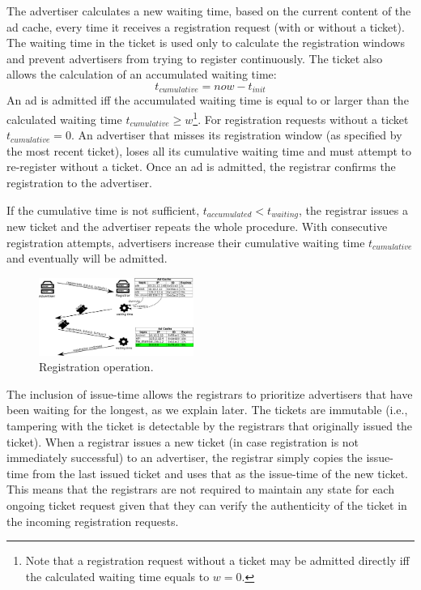 The advertiser calculates a new waiting time, based on the current content of
the ad cache, every time it receives a registration request (with or without
a ticket). The waiting time in the ticket is used only to calculate the
registration windows and prevent advertisers from trying to register
continuously. The ticket also allows the calculation of an accumulated waiting time:
\begin{equation}
    t_\textit{cumulative} = \textit{now} - t_\textit{init}
\end{equation}
An ad is admitted iff the accumulated waiting time is equal to or larger than the calculated waiting time $t_\textit{cumulative} \ge w$\footnote{Note that a registration request without a ticket may be admitted directly iff the calculated waiting time equals to $w=0$.}. For registration requests without a ticket $t_\textit{cumulative} = 0$. An advertiser that misses its registration window (as specified by the most recent ticket), loses all its cumulative waiting time and must attempt to re-register without a ticket. Once an ad is admitted, the registrar confirms the registration to the advertiser.

If the cumulative time is not sufficient, $t_\textit{accumulated} < t_\textit{waiting}$, the registrar issues a new ticket and the advertiser repeats the whole procedure. With consecutive registration attempts, advertisers increase their cumulative waiting time $t_\textit{cumulative}$ and eventually will be admitted. 


\begin{figure}
    \includegraphics[width=0.45\textwidth]{img/registration}
    \vspace{-0.15in}
    \caption{Registration operation.}
    \label{fig:registration}
    \vspace{-0.15in}
\end{figure}

The inclusion of issue-time allows the registrars to prioritize advertisers that have been waiting for the longest, as we explain later. The tickets are immutable (i.e., tampering with the ticket is detectable by the registrars that originally issued the ticket). When a registrar issues a new ticket (in case registration is not immediately successful) to an advertiser, the registrar simply copies the issue-time from the last issued ticket and uses that as the issue-time of the new ticket. This means that the registrars are not required to maintain any state for each ongoing ticket request given that they can verify the authenticity of the ticket in the incoming registration requests.



